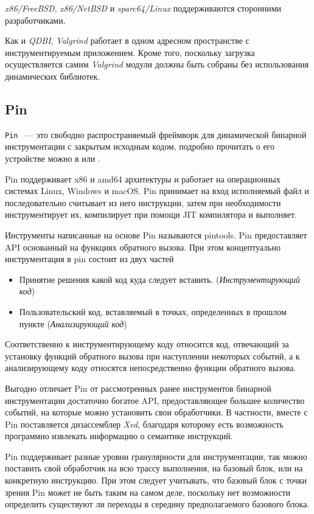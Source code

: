 \emph{x86/FreeBSD}, \emph{x86/NetBSD} и \emph{sparc64/Linux} поддерживаются сторонними разработчиками.

Как и \emph{QDBI}, \emph{Valgrind} работает в одном адресном пространстве с инструментируемым приложением. Кроме того, поскольку загрузка осуществляется самим \emph{Valgrind} модули должны быть собраны без использования динамических библиотек.

\subsection{Pin}

\texttt{Pin} ~--- это свободно распространяемый фреймворк для динамической бинарной инструментации с закрытым исходным кодом, подробно прочитать о его устройстве можно в \cite{PIN} или \cite{PBA}.

Pin поддерживает x86 и amd64 архитектуры и работает на операционных системах Linux, Windows и macOS. Pin принимает на вход исполняемый файл и последовательно считывает из него инструкции, затем при необходимости инструментирует их, компилирует при помощи JIT компилятора и выполняет.

Инструменты написанные на основе Pin называются pintools. Pin предоставляет API основанный на функциях обратного вызова. При этом концептуально инструментация в pin состоит из двух частей

\begin{itemize}
    \item Принятие решения какой код куда следует вставить. (\emph{Инструментирующий код})
    \item Пользовательский код, вставляемый в точках, определенных в прошлом пункте (\emph{Анализирующий код})
\end{itemize}

Соответственно к инструментирующему коду относится код, отвечающий за установку функций обратного вызова при наступлении некоторых событий, а к анализирующему коду относятся непосредственно функции обратного вызова.

Выгодно отличает Pin от рассмотренных ранее инструментов бинарной инструментации достаточно богатое API, предоставляющее большее количество событий, на которые можно установить свои обработчики. В частности, вместе с Pin поставляется дизассемблер \emph{Xed}, благодаря которому есть возможность программно извлекать информацию о семантике инструкций.

Pin поддерживает разные уровни гранулярности для инструментации, так можно поставить свой обработчик на всю трассу выполнения, на базовый блок, или на конкретную инструкцию. При этом следует учитывать, что базовый блок с точки зрения Pin может не быть таким на самом деле, поскольку нет возможности определить существуют ли переходы в середину предполагаемого базового блока.

